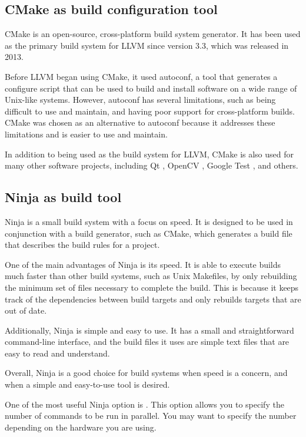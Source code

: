 \subsection{CMake as build configuration tool}
CMake is an open-source, cross-platform build system generator. It has been used
as the primary build system for LLVM since version 3.3, which was released in
2013. 

Before LLVM began using CMake, it used autoconf, a tool that generates a
configure script that can be used to build and install software on a wide range
of Unix-like systems. However, autoconf has several limitations, such as being
difficult to use and maintain, and having poor support for cross-platform
builds. CMake was chosen as an alternative to autoconf because it addresses
these limitations and is easier to use and maintain. 

In addition to being used as the build system for LLVM, CMake is also used for
many other software projects, including Qt \citep{enwiki:qt}, OpenCV \citep{enwiki:opencv}, Google Test \citep{enwiki:gtest},
and others.

\subsection{Ninja as build tool}

Ninja is a small build system with a focus on speed. It is designed to be used
in conjunction with a build generator, such as CMake, which generates a build
file that describes the build rules for a project. 

One of the main advantages of Ninja is its speed. It is able to execute builds
much faster than other build systems, such as Unix Makefiles, by only rebuilding
the minimum set of files necessary to complete the build. This is because it
keeps track of the dependencies between build targets and only rebuilds targets
that are out of date. 

Additionally, Ninja is simple and easy to use. It has a small and
straightforward command-line interface, and the build files it uses are simple
text files that are easy to read and understand. 

Overall, Ninja is a good choice for build systems when speed is a concern, and
when a simple and easy-to-use tool is desired.

One of the most useful Ninja option is . This option allows you to
specify the number of commands to be run in parallel. You may want to specify
the number depending on the hardware you are using. 

